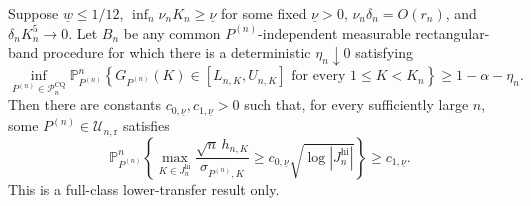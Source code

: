 Suppose \(\underline w\leq1/12\), \(\inf_n\nu_nK_n\geq\underline\nu\) for some fixed \(\underline\nu>0\), \(\nu_n\delta_n=O(r_n)\), and \(\delta_nK_n^5\to0\).  Let \(B_n\) be any common \(P^{(n)}\)-independent measurable rectangular-band procedure for which there is a deterministic \(\eta_n\downarrow0\) satisfying
\[
 \inf_{P^{(n)}\in\mathcal P_n^{\mathrm{CQ}}}
 \mathbb P_{P^{(n)}}^n\!\left\{G_{P^{(n)}}(K)\in[L_{n,K},U_{n,K}]
 \text{ for every }1\leq K<K_n\right\}\geq1-\alpha-\eta_n.
\]
Then there are constants \(c_{0,\underline\nu},c_{1,\underline\nu}>0\) such that, for every sufficiently large \(n\), some \(P^{(n)}\in\mathcal U_{n,\mathrm r}\) satisfies
\[
 \mathbb P_{P^{(n)}}^n\!\left\{
 \max_{K\in J_n^{\mathrm{hi}}}\frac{\sqrt n\,h_{n,K}}{\sigma_{P^{(n)},K}}
 \geq c_{0,\underline\nu}\sqrt{\log|J_n^{\mathrm{hi}}|}\right\}
 \geq c_{1,\underline\nu}.
\]
This is a full-class lower-transfer result only.